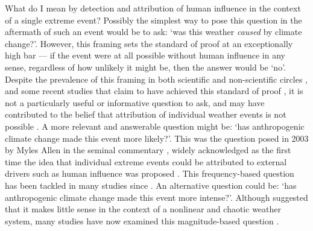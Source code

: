   What do I mean by detection and attribution of human influence in the context of a single extreme event? Possibly the simplest way to pose this question in the aftermath of such an event would be to ask: `was this weather \emph{caused} by climate change?'. However, this framing sets the standard of proof at an exceptionally high bar --- if the event were at all possible without human influence in any sense, regardless of how unlikely it might be, then the answer would be `no'. Despite the prevalence of this framing in both scientific and non-scientific circles \citep{allen_scientific_2007,wuebbles_detection_2017}, and some recent studies that claim to have achieved this standard of proof \citep{imada_july_2019}, it is not a particularly useful or informative question to ask, and may have contributed to the belief that attribution of individual weather events is not possible \citep{solow_extreme_2015}. A more relevant and answerable question might be: `has anthropogenic climate change made this event more likely?'. This was the question posed in 2003 by Myles Allen in the seminal commentary  \citep{allen_liability_2003}, widely acknowledged as the first time the idea that individual extreme events could be attributed to external drivers such as human influence was proposed \citep{otto_attribution_2017}. This frequency-based question has been tackled in many studies since \citep{stott_human_2004}. An alternative question could be: `has anthropogenic climate change made this event more intense?'. Although \citet{allen_scientific_2007} suggested that it makes little sense in the context of a nonlinear and chaotic weather system, many studies have now examined this magnitude-based question \citep{dole_was_2011}. 


